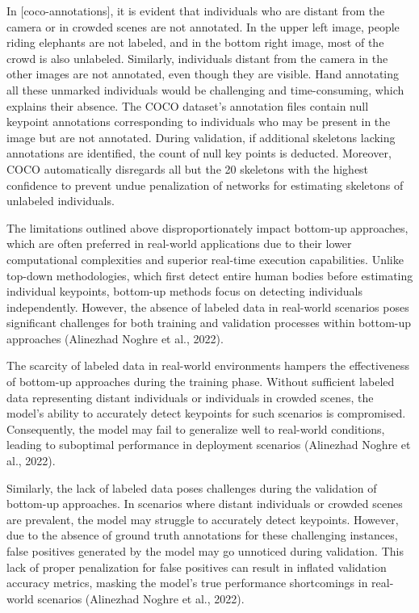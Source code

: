 
In [coco-annotations], it is evident that individuals who are distant from the camera or in crowded scenes are not annotated. In the upper left image, people riding elephants are not labeled, and in the bottom right image, most of the crowd is also unlabeled. Similarly, individuals distant from the camera in the other images are not annotated, even though they are visible. Hand annotating all these unmarked individuals would be challenging and time-consuming, which explains their absence. The COCO dataset's annotation files contain null keypoint annotations corresponding to individuals who may be present in the image but are not annotated. During validation, if additional skeletons lacking annotations are identified, the count of null key points is deducted. Moreover, COCO automatically disregards all but the 20 skeletons with the highest confidence to prevent undue penalization of networks for estimating skeletons of unlabeled individuals.

The limitations outlined above disproportionately impact bottom-up approaches, which are often preferred in real-world applications due to their lower computational complexities and superior real-time execution capabilities. Unlike top-down methodologies, which first detect entire human bodies before estimating individual keypoints, bottom-up methods focus on detecting individuals independently. However, the absence of labeled data in real-world scenarios poses significant challenges for both training and validation processes within bottom-up approaches (\scc Alinezhad Noghre et al., 2022).

The scarcity of labeled data in real-world environments hampers the effectiveness of bottom-up approaches during the training phase. Without sufficient labeled data representing distant individuals or individuals in crowded scenes, the model's ability to accurately detect keypoints for such scenarios is compromised. Consequently, the model may fail to generalize well to real-world conditions, leading to suboptimal performance in deployment scenarios (\scc Alinezhad Noghre et al., 2022).

Similarly, the lack of labeled data poses challenges during the validation of bottom-up approaches. In scenarios where distant individuals or crowded scenes are prevalent, the model may struggle to accurately detect keypoints. However, due to the absence of ground truth annotations for these challenging instances, false positives generated by the model may go unnoticed during validation. This lack of proper penalization for false positives can result in inflated validation accuracy metrics, masking the model's true performance shortcomings in real-world scenarios (\scc Alinezhad Noghre et al., 2022).

